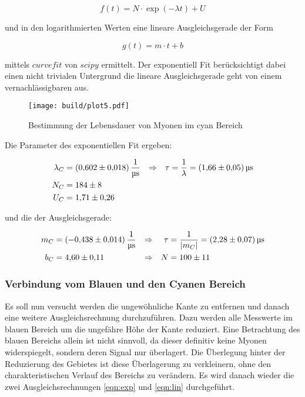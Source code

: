 \begin{equation}
	f(t)=N \cdot \exp(-\lambda t) + U
	\label{eqn:exp}
\end{equation}

und in den logarithmierten Werten eine lineare Ausgleichsgerade der Form

\begin{equation}
	g(t)=m \cdot t +b
	\label{eqn:lin}
\end{equation}

mittels $curve fit$ von $scipy$ ermittelt. 
Der exponentiell Fit berücksichtigt dabei einen nicht trivialen Untergrund die lineare Ausgleichsgerade geht von einem vernachlässigbaren aus. 

\begin{figure}[H]
	\centering
	\texttt{[image: build/plot5.pdf]}
	\caption{Bestimmung der Lebensdauer von Myonen im cyan Bereich}\label{fig:plt5}
\end{figure}

Die Parameter des exponentiellen Fit ergeben:

\begin{align}
	\lambda_C&=\qty{0.602(0.018)}{\per\us} &\Rightarrow & & \tau&=\frac{1}{\lambda }=\qty{1.66(0.05)}{\us} \\
	N_C&=\num{184(8)} \notag \\
	U_C&=\num{1.71(0.26)} \notag
\end{align}

und die der Ausgleichsgerade: 

\begin{align}
	m_C&=\qty{-0.438(0.014)}{\per\us} &\Rightarrow & & \tau&=\frac{1}{|m_C|}=\qty{2.28(0.07)}{\us} \\
	b_C&=\num{4.60(0.11)} &\Rightarrow & & N&=\num{100(11)} \notag
\end{align}

\subsubsection{Verbindung vom Blauen und den Cyanen Bereich}
Es soll nun versucht werden die ungewöhnliche Kante zu entfernen und danach eine weitere Ausgleichsrechnung durchzuführen. 
Dazu werden alle Messwerte im blauen Bereich um die ungefähre Höhe der Kante reduziert. 
Eine Betrachtung des blauen Bereichs allein ist nicht sinnvoll, da dieser definitiv keine Myonen widerspiegelt, sondern deren Signal nur überlagert. 
Die Überlegung hinter der Reduzierung des Gebietes ist diese Überlagerung zu verkleinern, ohne den charakteristischen Verlauf des Bereichs zu verändern. 
Es wird danach wieder die zwei Ausgleichsrechnungen \eqref{eqn:exp} und \eqref{eqn:lin} durchgeführt. 

